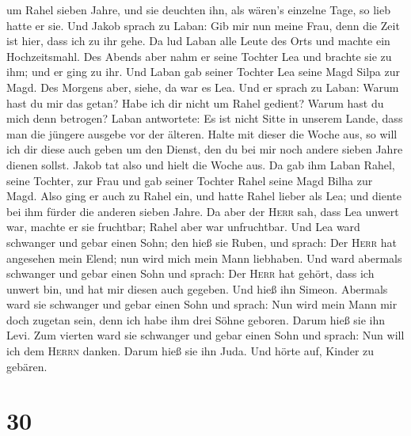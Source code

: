 um Rahel sieben Jahre, und sie deuchten ihn, als wären's einzelne Tage,
so lieb hatte er sie.  Und Jakob sprach zu Laban: Gib mir
nun meine Frau, denn die Zeit ist hier, dass ich zu ihr gehe.
 Da lud Laban alle Leute des Orts und machte ein
Hochzeitsmahl.  Des Abends aber nahm er seine Tochter Lea
und brachte sie zu ihm; und er ging zu ihr.  Und Laban
gab seiner Tochter Lea seine Magd Silpa zur Magd.  Des
Morgens aber, siehe, da war es Lea. Und er sprach zu Laban: Warum hast
du mir das getan? Habe ich dir nicht um Rahel gedient? Warum hast du
mich denn betrogen?  Laban antwortete: Es ist nicht Sitte
in unserem Lande, dass man die jüngere ausgebe vor der älteren.
 Halte mit dieser die Woche aus, so will ich dir diese
auch geben um den Dienst, den du bei mir noch andere sieben Jahre dienen
sollst.  Jakob tat also und hielt die Woche aus. Da gab
ihm Laban Rahel, seine Tochter, zur Frau  und gab seiner
Tochter Rahel seine Magd Bilha zur Magd.  Also ging er
auch zu Rahel ein, und hatte Rahel lieber als Lea; und diente bei ihm
fürder die anderen sieben Jahre.  Da aber der
\textsc{Herr} sah, dass Lea unwert war, machte er sie fruchtbar; Rahel
aber war unfruchtbar.  Und Lea ward schwanger und gebar
einen Sohn; den hieß sie Ruben, und sprach: Der \textsc{Herr} hat
angesehen mein Elend; nun wird mich mein Mann liebhaben. 
Und ward abermals schwanger und gebar einen Sohn und sprach: Der
\textsc{Herr} hat gehört, dass ich unwert bin, und hat mir diesen auch
gegeben. Und hieß ihn Simeon.  Abermals ward sie
schwanger und gebar einen Sohn und sprach: Nun wird mein Mann mir doch
zugetan sein, denn ich habe ihm drei Söhne geboren. Darum hieß sie ihn
Levi.  Zum vierten ward sie schwanger und gebar einen
Sohn und sprach: Nun will ich dem \textsc{Herrn} danken. Darum hieß sie
ihn Juda. Und hörte auf, Kinder zu gebären.

\hypertarget{section-29}{%
\section{30}\label{section-29}}

